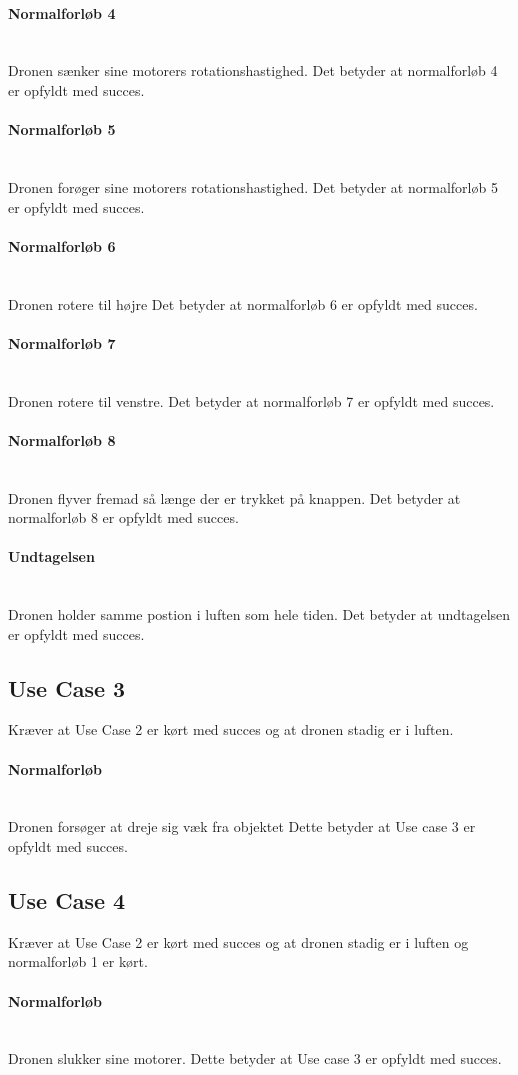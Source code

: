 \documentclass[Main]{subfiles}
\begin{document}
\paragraph{Normalforløb 4}\mbox{}\\
Dronen sænker sine motorers rotationshastighed.
Det betyder at normalforløb 4 er opfyldt med succes.

\paragraph{Normalforløb 5}\mbox{}\\
Dronen forøger sine motorers rotationshastighed.
Det betyder at normalforløb 5 er opfyldt med succes.

\paragraph{Normalforløb 6}\mbox{}\\
Dronen rotere til højre
Det betyder at normalforløb 6 er opfyldt med succes.

\paragraph{Normalforløb 7}\mbox{}\\
Dronen rotere til venstre.
Det betyder at normalforløb 7 er opfyldt med succes.

\paragraph{Normalforløb 8}\mbox{}\\
Dronen flyver fremad så længe der er trykket på knappen.
Det betyder at normalforløb 8 er opfyldt med succes.

\paragraph{Undtagelsen}\mbox{}\\
Dronen holder samme postion i luften som hele tiden.
Det betyder at undtagelsen er opfyldt med succes.


\subsection{Use Case 3}
Kræver at Use Case 2 er kørt med succes og at dronen stadig er i luften.
\paragraph{Normalforløb}\mbox{}\\
Dronen forsøger at dreje sig væk fra objektet 
Dette betyder at Use case 3 er opfyldt med succes.

\subsection{Use Case 4}
Kræver at Use Case 2 er kørt med succes og at dronen stadig er i luften og normalforløb 1 er kørt.
\paragraph{Normalforløb}\mbox{}\\
Dronen slukker sine motorer.
Dette betyder at Use case 3 er opfyldt med succes.
\end{document}
